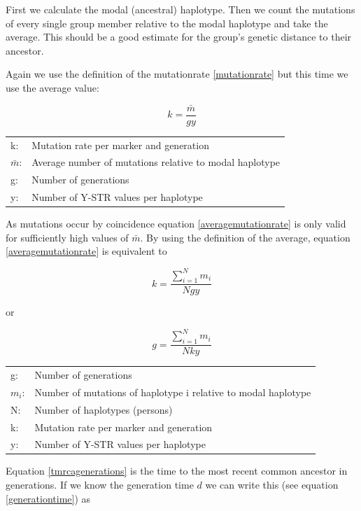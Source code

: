 First we calculate the modal (ancestral) haplotype. Then we
count the mutations of every single group member relative to
the modal haplotype and take the average. This should be a
good estimate for the group's genetic distance to their ancestor. 

Again we use the definition of the mutationrate \ref{mutationrate}
but this time we use the average value:

\begin{equation}
k = \frac{\bar{m}}{g y} \label{averagemutationrate}
\end{equation}

\begin{tabular}{ll}
k: &  Mutation rate per marker and generation\\
$\bar{m}$: &  Average number of mutations relative to modal haplotype\\
g: &  Number of generations \\
y: &  Number of Y-STR values per haplotype
\end{tabular}
\vspace{1em}

As mutations occur by coincidence equation \ref{averagemutationrate}
is only valid for sufficiently high values of $\bar{m}$.
By using the definition of the average, equation
\ref{averagemutationrate} is equivalent to

\begin{equation}
k = \frac{\sum_{i=1}^{N} m_i}{N g y}
\end{equation}

or

\begin{equation}
g = \frac{\sum_{i=1}^{N} m_i}{N k y}\label{tmrcagenerations}
\end{equation}

\begin{tabular}{ll}
g: &  Number of generations \\
$m_i$: &  Number of mutations of haplotype i relative to modal haplotype\\
N: &  Number of haplotypes (persons) \\
k: &  Mutation rate per marker and generation\\
y: &  Number of Y-STR values per haplotype
\end{tabular}
\vspace{1em}

Equation \ref{tmrcagenerations} is the time to the most recent
common ancestor in generations. If we know the generation time
$d$ we can write this (see equation \ref{generationtime}) as

